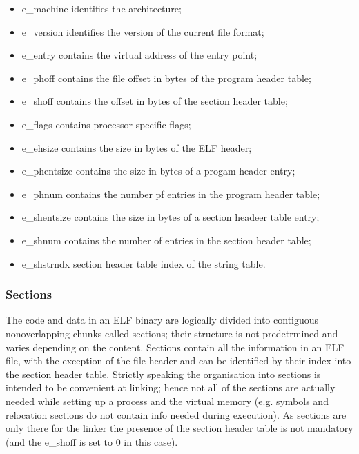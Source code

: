 \begin{itemize}
\begin{center}
\begin{tabular}{|c|c|c|}
            \hline 
        \end{tabular} 
    \end{center} 
    \item {\ttfamily e\_machine} identifies the architecture;
    \item {\ttfamily e\_version} identifies the version of the current file format;
    \item {\ttfamily e\_entry} contains the virtual address of the entry point;
    \item {\ttfamily e\_phoff} contains the file offset in bytes of the program header table;
    \item {\ttfamily e\_shoff} contains the offset in bytes of the section header table;
    \item {\ttfamily e\_flags} contains processor specific flags;
    \item {\ttfamily e\_ehsize} contains the size in bytes of the ELF header;
    \item {\ttfamily e\_phentsize} contains the size in bytes of a progam header entry;
    \item {\ttfamily e\_phnum} contains the number pf entries in the program header table;
    \item {\ttfamily e\_shentsize} contains the size in bytes of a section headeer table entry;
    \item {\ttfamily e\_shnum} contains the number of entries in the section header table;
    \item {\ttfamily e\_shstrndx} section header table index of the string table.
\end{itemize}
\subsubsection{Sections}
The code and data in an ELF binary are logically divided into contiguous nonoverlapping chunks called sections; their structure is not predetrmined and varies depending on the content.  Sections contain all the information in an ELF file, with the exception of the file header and can be identified by their index into the section header table.  Strictly speaking the organisation into sections is intended to be convenient at linking; hence not all of the sections are actually needed while setting up a process and the virtual memory (e.g.  symbols and relocation sections do not contain info needed during execution). As sections are only there for the linker the presence of the section header   table is not mandatory (and the {\ttfamily e\_shoff} is set to 0 in this case).
